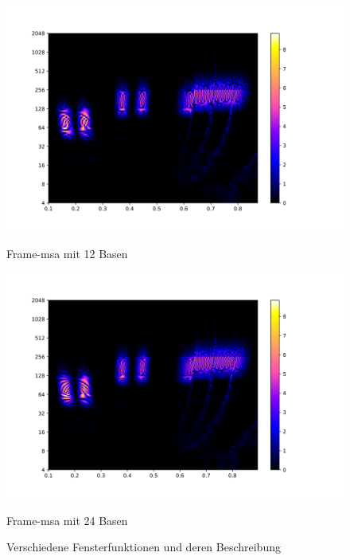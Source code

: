 \begin{figure}[!ht]
	\begin{minipage}{.5\linewidth}
	\centering
	\includegraphics[width=\linewidth]{papers/autotune/sections/frames/images/12dwt.jpg}
	\caption{Frame-msa mit 12 Basen}
	\end{minipage}
	
	\begin{minipage}{.5\linewidth}
		\centering
		\includegraphics[width=\linewidth]{papers/autotune/sections/frames/images/24dwt.jpg}
		\caption{Frame-msa mit 24 Basen}
	\end{minipage}

	
	\caption{Verschiedene Fensterfunktionen und deren Beschreibung}\cite{wikipedia:Window}
	\label{fig:STFTtab}
\end{figure}


